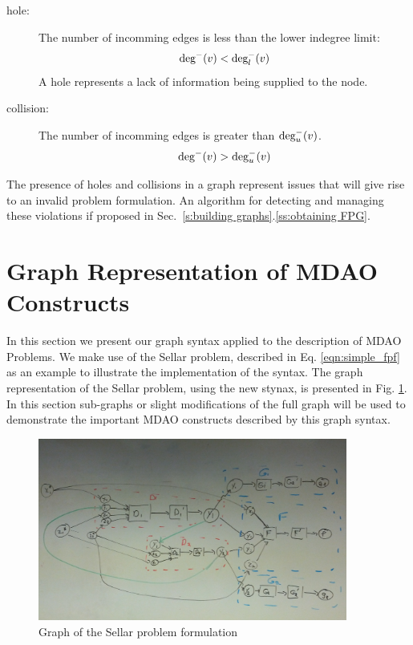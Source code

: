   \begin{description}
    \item[hole: ] The number of incomming edges is less than the lower indegree limit:
      \begin{equation} \textrm{deg}^-(v) < \textrm{deg}_l^-(v) \label{e:hole} \end{equation}
      A hole represents a lack of information being supplied to the node.
    \item[collision: ] The number of incomming edges is greater than $ \textrm{deg}_u^-(v)$. 
      \begin{equation} \textrm{deg}^-(v) > \textrm{deg}_u^-(v) \label{e:collision}\end{equation}
  \end{description} 

  The presence of holes and collisions in a graph represent issues that will give
  rise to an invalid problem formulation. An algorithm for detecting and 
  managing these violations if proposed in Sec.~\ref{s:building graphs}.\ref{ss:obtaining FPG}.

\section{Graph Representation of MDAO Constructs}
\label{s:graph representation}
In this section we present our graph syntax applied to the description of MDAO 
Problems. We make use of the Sellar problem, described in 
Eq. \ref{eqn:simple_fpf} as an example to illustrate the implementation of the syntax. 
The graph representation of the Sellar problem, using the new stynax, is 
presented in Fig. \ref{f:sellar_graph_full}. In this section sub-graphs or 
slight modifications of the full graph will be used to demonstrate the 
important MDAO constructs described by this graph syntax.

\begin{figure}[htb!]
    \begin{center}
    \includegraphics[width=4in]{images/sellar_graph_full}
    \end{center}
    \vspace{-10pt}
\caption{Graph of the Sellar problem formulation}
\label{f:sellar_graph_full}
\end{figure}

